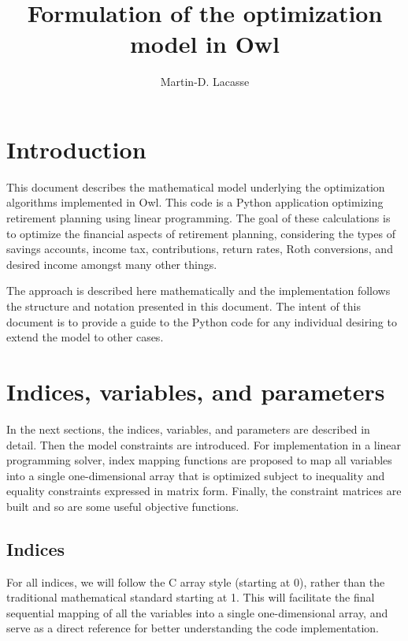 \documentclass{report}[fleqn,12pt]
\begin{document}
\title{Formulation of the optimization model in Owl}
\author{Martin-D. Lacasse}
\maketitle
\thispagestyle{fancy}
\fancyhead{}

\chapter{Introduction}
This document describes the mathematical model underlying
the optimization algorithms implemented in
Owl. This code is a Python application optimizing retirement
planning using linear programming. The goal of
these calculations is to optimize the financial aspects
of retirement planning, considering the types of savings accounts,
income tax, contributions, return rates, Roth conversions,
and desired income amongst many other things.

The approach is described here mathematically and the implementation
follows the structure and notation presented in this document.
The intent of this document is to provide a guide to the Python code
for any individual desiring to extend the model to other cases.

\chapter{Indices, variables, and parameters}
In the next sections, the indices, variables, and parameters are
described in detail. Then the model constraints are introduced.
For implementation in a linear programming solver, index mapping
functions are proposed to map all variables into a single
one-dimensional array that
is optimized subject to inequality and equality constraints
expressed in matrix form. Finally, the constraint matrices are built
and so are some useful objective functions.

\section{Indices}
For all indices, we will follow the C array style (starting at 0),
rather than the traditional mathematical standard starting at 1.
This will facilitate the final
sequential mapping of all the variables into a single one-dimensional array,
and serve as a direct reference for better understanding the code implementation.
\end{document}
